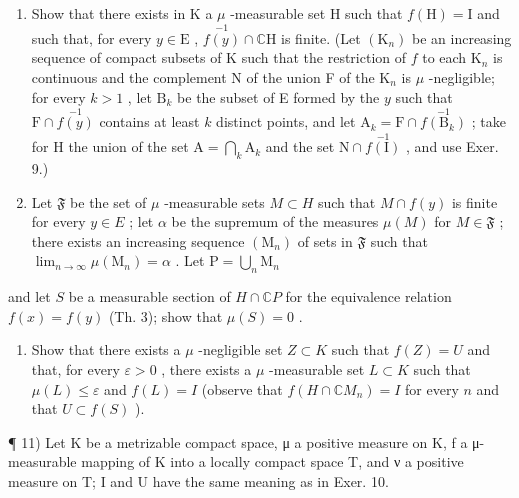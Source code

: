 \begin{enumerate}
\def\labelenumi{\alph{enumi})}
\item
  Show that there exists in K a \(\mu\) -measurable set H such that \(f(\mathrm{H}) = \mathrm{I}\) and such that, for every \(y \in \mathrm{E}\) , \(\stackrel{-1}{f(y)} \cap \mathbb{C}\mathrm{H}\) is finite. (Let \((\mathrm{K}_n)\) be an increasing sequence of compact subsets of K such that the restriction of \(f\) to each \(\mathrm{K}_n\) is continuous and the complement N of the union F of the \(\mathrm{K}_n\) is \(\mu\) -negligible; for every \(k > 1\) , let \(\mathrm{B}_k\) be the subset of E formed by the \(y\) such that \(\mathrm{F} \cap \stackrel{-1}{f(y)}\) contains at least \(k\) distinct points, and let \(\mathrm{A}_k = \mathrm{F} \cap \stackrel{-1}{f(\mathrm{B}_k)}\) ; take for H the union of the set \(\mathrm{A} = \bigcap_k \mathrm{A}_k\) and the set \(\mathrm{N} \cap \stackrel{-1}{f(\mathrm{I})}\) , and use Exer. 9.)
\item
  Let \(\mathfrak{F}\) be the set of \(\mu\) -measurable sets \(M \subset H\) such that \(M \cap f(y)\) is finite for every \(y \in E\) ; let \(\alpha\) be the supremum of the measures \(\mu(M)\) for \(M \in \mathfrak{F}\) ; there exists an increasing sequence \((\mathrm{M}_n)\) of sets in \(\mathfrak{F}\) such that \(\lim_{n\to \infty}\mu (\mathrm{M}_n) = \alpha\) . Let \(\mathrm{P} = \bigcup_{n}\mathrm{M}_{n}\)
\end{enumerate}

and let \(S\) be a measurable section of \(H \cap \mathbb{C}P\) for the equivalence relation \(f(x) = f(y)\) (Th. 3); show that \(\mu(S) = 0\) .

\begin{enumerate}
\def\labelenumi{\alph{enumi})}
\setcounter{enumi}{2}
\tightlist
\item
  Show that there exists a \(\mu\) -negligible set \(Z \subset K\) such that \(f(Z) = U\) and that, for every \(\varepsilon > 0\) , there exists a \(\mu\) -measurable set \(L \subset K\) such that \(\mu(L) \leqslant \varepsilon\) and \(f(L) = I\) (observe that \(f(H \cap \mathbb{C}M_n) = I\) for every \(n\) and that \(U \subset f(S)\) ).
\end{enumerate}

¶ 11) Let K be a metrizable compact space, μ a positive measure on K, f a μ-measurable mapping of K into a locally compact space T, and ν a positive measure on T; I and U have the same meaning as in Exer. 10.

